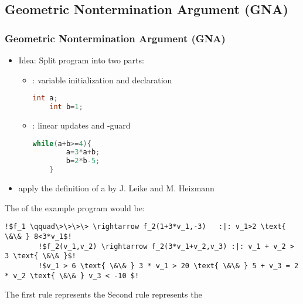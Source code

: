 \subsection{Geometric Nontermination Argument (GNA)}
\begin{frame}[fragile]
	\frametitle{Geometric Nontermination Argument (GNA)}
	\begin{itemize}
		\item Idea: Split program into two parts:
			\begin{itemize}
				\item \stem: variable initialization and declaration
					\begin{lstlisting}[language = java]
	int a;
	int b=1;
					\end{lstlisting}
				\item \loopt: linear updates and -guard
				\begin{lstlisting}[language = java]
	while(a+b>=4){
		a=3*a+b;
		b=2*b-5;
	}
				\end{lstlisting}
			\end{itemize}
		\item apply the definition of a \gna by J. Leike and M. Heizmann 
	\end{itemize}
\end{frame}

\begin{frame}[fragile]
	\begin{example}
		The \its of the example program would be: \newline
		\begin{lstlisting}[linewidth=10.5cm, escapechar = !]
		!$f_1 \qquad\>\>\>\> \rightarrow f_2(1+3*v_1,-3)   :|: v_1>2 \text{ \&\& } 8<3*v_1$!
		!$f_2(v_1,v_2) \rightarrow f_2(3*v_1+v_2,v_3) :|: v_1 + v_2 > 3 \text{ \&\& }$! 
		!$v_1 > 6 \text{ \&\& } 3 * v_1 > 20 \text{ \&\& } 5 + v_3 = 2 * v_2 \text{ \&\& } v_3 < -10 $!
		\end{lstlisting}
		The first rule represents the \stem \newline
		Second rule represents the \loopt
	\end{example}	
\end{frame}


